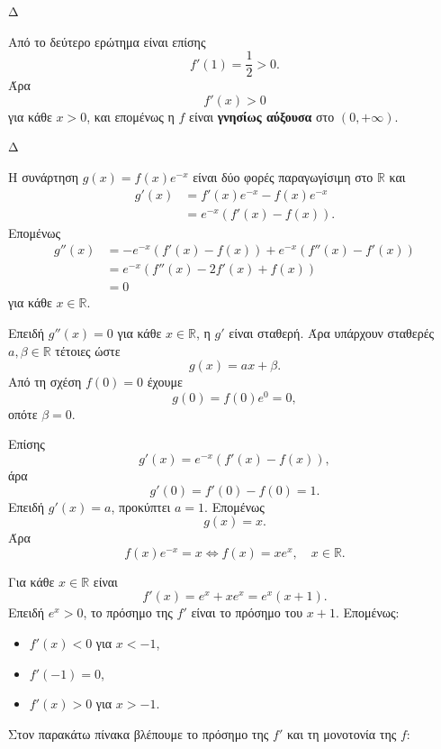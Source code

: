 \begin{thema}{Δ}
\begin{erwthma}
Από το δεύτερο ερώτημα είναι επίσης
\[
f'(1)=\frac{1}{2}>0.
\]
Άρα
\[
f'(x)>0
\]
για κάθε $x>0$, και επομένως η $f$ είναι \textbf{γνησίως αύξουσα} στο $(0,+\infty)$.
\end{erwthma}
\end{thema}

\begin{thema}{Δ}
\begin{erwthma}
\item Η συνάρτηση $g(x)=f(x)e^{-x}$ είναι δύο φορές παραγωγίσιμη στο $\mathbb{R}$ και
\begin{align*}
g'(x)
&=f'(x)e^{-x}-f(x)e^{-x}\\
&=e^{-x}\left(f'(x)-f(x)\right).
\end{align*}
Επομένως
\begin{align*}
g''(x)
&=-e^{-x}\left(f'(x)-f(x)\right)
+e^{-x}\left(f''(x)-f'(x)\right)\\
&=e^{-x}\left(f''(x)-2f'(x)+f(x)\right)\\
&=0
\end{align*}
για κάθε $x\in\mathbb{R}$.

\item Επειδή $g''(x)=0$ για κάθε $x\in\mathbb{R}$, η $g'$ είναι σταθερή. Άρα υπάρχουν σταθερές $a,\beta\in\mathbb{R}$ τέτοιες ώστε
\[
g(x)=ax+\beta.
\]
Από τη σχέση $f(0)=0$ έχουμε
\[
g(0)=f(0)e^0=0,
\]
οπότε $\beta=0$.

Επίσης
\[
g'(x)=e^{-x}\left(f'(x)-f(x)\right),
\]
άρα
\[
g'(0)=f'(0)-f(0)=1.
\]
Επειδή $g'(x)=a$, προκύπτει $a=1$. Επομένως
\[
g(x)=x.
\]
Άρα
\[
f(x)e^{-x}=x
\Leftrightarrow
{f(x)=xe^x},
\quad x\in\mathbb{R}.
\]

\item Για κάθε $x\in\mathbb{R}$ είναι
\[
f'(x)=e^x+xe^x=e^x(x+1).
\]
Επειδή $e^x>0$, το πρόσημο της $f'$ είναι το πρόσημο του $x+1$. Επομένως:
\begin{itemize}
\item $f'(x)<0$ για $x<-1$,
\item $f'(-1)=0$,
\item $f'(x)>0$ για $x>-1$.
\end{itemize}
Στον παρακάτω πίνακα βλέπουμε το πρόσημο της $f'$ και τη μονοτονία της $f$:
\begin{center}
\end{center}


\end{erwthma}
\end{thema}
